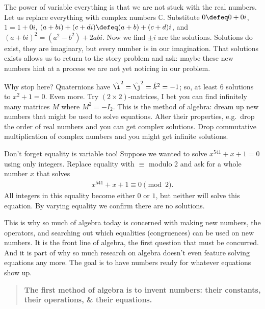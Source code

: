 The power of variable everything is that we are not stuck with the real numbers.
Let us replace everything with complex numbers $\mathbb{C}$. Substitute $0\defeq
0+0i$, $1=1+0i$, $(a+bi)+(c+di)\defeq (a+b)+(c+d)i$, and
$(a+bi)^2=(a^2-b^2)+2abi$.  Now we find $\pm i$ are the solutions. Solutions do
exist, they are imaginary, but every number is in our imagination. 
That solutions exists allows us to return to the story problem and ask:
maybe these new numbers hint at a process we are not yet noticing in our 
problem.

Why stop here? Quaternions have $\hat{\i}^2=\hat{\j}^2=\hat{k}^2=-1$;
so, at least 6 solutions to $x^2+1=0$.  Even more.  Try $(2\times 2)$-matrices, I
bet you can find infinitely many matrices $M$ where $M^2=-I_2$.  This is the method
of algebra: dream up new numbers that might be used to solve equations.  Alter
their properties, e.g.\ drop the order of real numbers and you can get complex
solutions.  Drop commutative multiplication of complex numbers and you might get
infinite solutions.  

Don't forget equality is variable too!  Suppose we wanted to solve $x^{541}+x+1=0$
using only integers.  Replace equality 
with $\equiv$ modulo 2 and ask for a whole number $x$ that solves
\begin{align*}
    x^{541}+x+1\equiv 0\pmod{2}.
\end{align*}
All integers in this equality become either $0$ or $1$, but neither will solve 
this equation.  By varying equality we confirm there are no solutions.

This is why so much of algebra today is concerned with making new numbers, the
operators, and searching out which equalities (congruences) can be used on new
numbers.  It is the front line of algebra, the first question that must be
concurred.  And it is  part of why so much research on algebra doesn't even
feature solving equations any more.  The goal is to have numbers ready for
whatever equations show up.

\begin{quote}
    \textbf{The first method of algebra is to invent numbers: their constants,
    their operations, \& their equations.}%
\end{quote}

